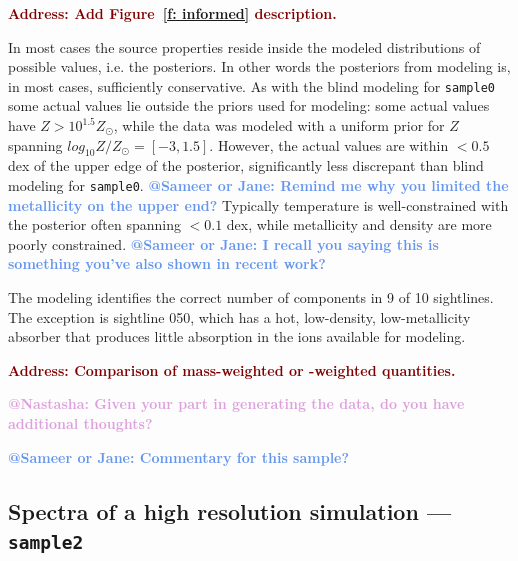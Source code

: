 \documentclass[fleqn,usenatbib]{mnras}
\makeatletter
\newcommand{\todo}[1]{\textcolor{Maroon}{\textbf{Address: #1}}}
\newcommand{\atsameer}[1]{\textcolor{CornflowerBlue}{\textbf{@Sameer or Jane: #1}}}
\newcommand{\atnastasha}[1]{\textcolor{Plum}{\textbf{@Nastasha: #1}}}
\makeatother
\begin{document}
\todo{Add Figure~\ref{f: informed} description.}

In most cases the source properties reside inside the modeled distributions of possible values, i.e. the posteriors.
In other words the posteriors from modeling is, in most cases, sufficiently conservative.
As with the blind modeling for \texttt{sample0} some actual values lie outside the priors used for modeling: some actual values have $Z > 10^{1.5} Z_\odot$, while the data was modeled with a uniform prior for $Z$ spanning $log_{10} Z/Z_\odot = [-3, 1.5]$.
However, the actual values are within $< 0.5$ dex of the upper edge of the posterior, significantly less discrepant than blind modeling for \texttt{sample0}.
\atsameer{Remind me why you limited the metallicity on the upper end?}
Typically temperature is well-constrained with the posterior often spanning $<0.1$ dex, while metallicity and density are more poorly constrained.
\atsameer{I recall you saying this is something you've also shown in recent work?}

The modeling identifies the correct number of components in 9 of 10 sightlines.
The exception is sightline 050, which has a hot, low-density, low-metallicity absorber that produces little absorption in the ions available for modeling.

\todo{Comparison of mass-weighted or -weighted quantities.}

\atnastasha{Given your part in generating the data, do you have additional thoughts?}

\atsameer{Commentary for this sample?}

\subsection{Spectra of a high resolution simulation --- \texttt{sample2}}
\label{s: results -- sample2}
\end{document}
